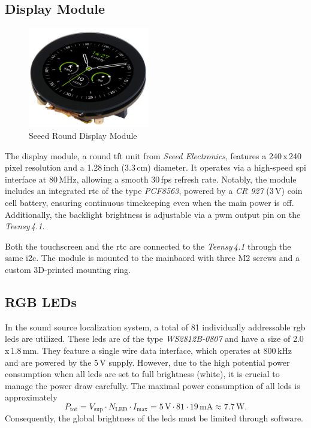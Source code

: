 \subsection{Display Module}
\begin{minipage}{\linewidth}
	\begin{figure}
		\vspace{-0.6cm}
		\includegraphics[width=5.3cm]{images/6_design_final/seeed_round_display_module.png}
		\centering
		\caption{Seeed Round Display Module}
		\label{fig:seeed_round_display_module}
	\end{figure}
	The display module, a round \acrshort{tft} unit from \textit{Seeed Electronics}, features a 240\,x\,240 pixel resolution and a 1.28\,inch (3.3\,cm) diameter.
	It operates via a high-speed \acrshort{spi} interface at 80\,MHz, allowing a smooth 30\,\acrshort{fps} refresh rate.
	Notably, the module includes an integrated \acrfull{rtc} of the type \textit{PCF8563},
	powered by a \textit{CR 927} (3\,V) coin cell battery, ensuring continuous timekeeping even when the main power is off.
	Additionally, the backlight brightness is adjustable via a \acrfull{pwm} output pin on the \textit{Teensy\,4.1}.

	Both the touchscreen and the \acrshort{rtc} are connected to the \textit{Teensy\,4.1} through the same \acrshort{i2c}.
	The module is mounted to the mainbaord with three M2 screws and a custom 3D-printed mounting ring.
\end{minipage}

\subsection{RGB LEDs}
In the sound source localization system, a total of 81 individually addressable \acrshort{rgb} \acrshort{led}s are utilized.
These \acrshort{led}s are of the type \textit{WS2812B-0807} and have a size of 2.0\,x\,1.8\,mm.
They feature a single wire data interface, which operates at 800\,kHz and are powered by the 5\,V supply.
However, due to the high potential power consumption when all \acrshort{led}s are set to full brightness (white), it is crucial to manage the power draw carefully.
The maximal power consumption of all \acrshort{led}s is approximately
\begin{equation} \label{eq:led_power_consumption}
	P_{\text{tot}} = V_{\text{sup}} \cdot N_{\text{LED}} \cdot I_{\text{max}} = 5\,\text{V} \cdot 81 \cdot 19\,\text{mA} \approx 7.7\,\text{W}.
\end{equation}
Consequently, the global brightness of the \acrshort{led}s must be limited through software.

